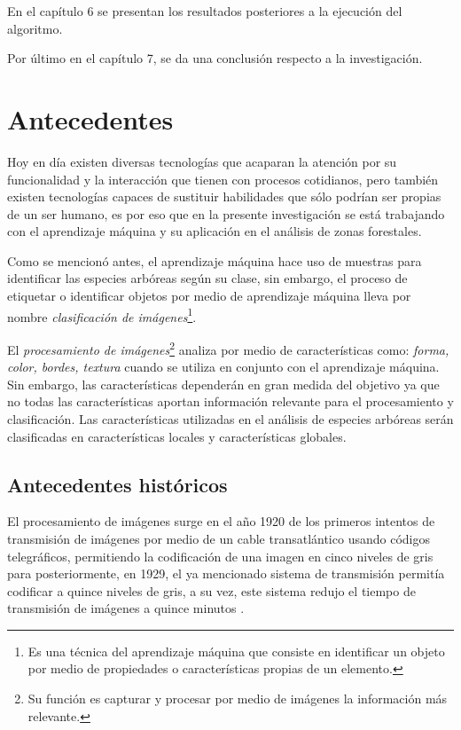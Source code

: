 En el capítulo 6 se presentan los resultados posteriores a la ejecución del algoritmo.

Por último en el capítulo 7, se da una conclusión respecto a la investigación.

\chapter{Antecedentes}
Hoy en día existen diversas tecnologías que acaparan la atención por su funcionalidad y la interacción que tienen con procesos cotidianos, pero también existen tecnologías capaces de sustituir habilidades que sólo podrían ser propias de un ser humano, es por eso que en la presente investigación se está trabajando con el aprendizaje máquina y su aplicación en el análisis de zonas forestales.

Como se mencionó antes, el aprendizaje máquina hace uso de muestras para identificar las especies arbóreas según su clase, sin embargo, el proceso de etiquetar o identificar objetos por medio de aprendizaje máquina lleva por nombre \emph{clasificación de imágenes}\footnote{Es una técnica del aprendizaje máquina que consiste en identificar un objeto por medio de propiedades o características propias de un elemento.}.

El \emph{procesamiento de imágenes}\footnote{Su función es capturar y procesar por medio de imágenes la información más relevante.} analiza por medio de características como: \emph{forma, color, bordes, textura} cuando se utiliza en conjunto con el aprendizaje máquina. Sin embargo, las características dependerán en gran medida del objetivo ya que no todas las características aportan información relevante para el procesamiento y clasificación. Las características utilizadas en el análisis de especies arbóreas serán clasificadas en características locales y características globales.

\section{Antecedentes históricos}
El procesamiento de imágenes surge en el año 1920 de los primeros intentos de transmisión de imágenes por medio de un cable transatlántico usando códigos telegráficos, permitiendo la codificación de una imagen en cinco niveles de gris para posteriormente, en 1929, el ya mencionado sistema de transmisión permitía codificar a quince niveles de gris, a su vez, este sistema redujo el tiempo de transmisión de imágenes a quince minutos \citep{rf4}. 

